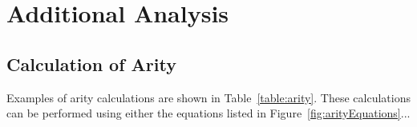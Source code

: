\chapter{Additional Analysis}\label{App:Analysis}

\section{Calculation of Arity}\label{AppSec:arity}


    Examples of arity calculations are shown in Table~\vref{table:arity}.  These calculations
    can be performed using either the equations listed in
    Figure~\vref{fig:arityEquations}...

   \begin{singlespacing}
    \begin{figure}[ht]
    \begin{boxedminipage}[h]{433pt}
        \begin{minipage}{400pt}


\end{minipage}
\end{boxedminipage}
\end{figure}
\end{singlespacing}

